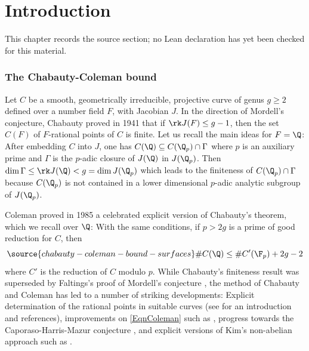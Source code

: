 \chapter{Introduction}
\label{chabauty-coleman-bound-surfaces-chapter-01}

\begin{remark}
\label{chabauty-coleman-bound-surfaces-chapter-01-source}
This chapter records the source section; no Lean declaration has yet been checked for this material.
\notready
\end{remark}

\subsection{The Chabauty-Coleman bound} Let $C$ be a smooth, geometrically irreducible, projective curve of genus $g\ge 2$ defined over a number field $F$, with Jacobian $J$. In the direction of Mordell's conjecture, Chabauty \cite{Chabauty} proved in 1941 that if $\rk J(F)\le g-1$, then the set $C(F)$ of $F$-rational points of $C$ is finite. Let us recall the main ideas for $F=\Q$: After embedding $C$ into $J$, one has $C(\Q)\subseteq C(\Q_p)\cap \Gamma$ where $p$ is an auxiliary prime and $\Gamma$ is the $p$-adic closure of $J(\Q)$ in $J(\Q_p)$. Then $\dim \Gamma \le \rk J(\Q)<g=\dim J(\Q_p)$ which leads to the finiteness of $C(\Q_p)\cap \Gamma$ because $C(\Q_p)$ is not contained in a lower dimensional $p$-adic analytic subgroup of $J(\Q_p)$.

 Coleman \cite{Coleman} proved in 1985 a celebrated explicit version of Chabauty's theorem, which we recall over $\Q$: With the same conditions, if $p>2g$ is a prime of good reduction for $C$, then
\begin{equation}\label{EqnColeman}
\source{chabauty-coleman-bound-surfaces}
\#C(\Q)\le  \#C'(\F_p) +2g-2
\end{equation}
where $C'$ is the reduction of $C$ modulo $p$. While Chabauty's finiteness result was superseded by Faltings's proof of Mordell's conjecture \cite{Faltings1}, the method of Chabauty and Coleman has led to a number of striking developments: Explicit determination of the rational points in suitable curves (see \cite{MPsurvey} for an introduction and references), improvements on \eqref{EqnColeman} such as \cite{LorenziniTucker,MPsurvey,Stollr,KatzZB}, progress towards the Caporaso-Harris-Mazur conjecture  \cite{Stoll,KRZ}, and explicit versions of Kim's non-abelian approach \cite{Kim} such as \cite{BBM,BD1,BDeffChKim,BD2,BDMTV,EdixhovenLido}.

